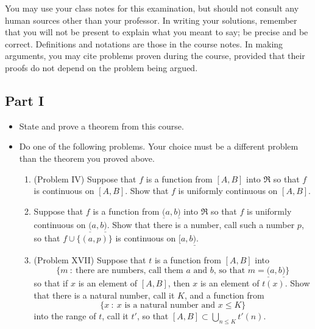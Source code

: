 \documentclass{article}
\begin{document}
You may use your class notes for this examination, but should not consult any human sources other than your professor. In writing your solutions, remember that you will not be present to explain what you meant to say; be precise and be correct. Definitions and notations are those in the course notes. In making arguments, you may cite problems proven during the course, provided that their proofs do not depend on the problem being argued.

\subsection*{Part I}

\begin{itemize}

  \item[1.] State and prove a theorem from this course.

  \item[2.] Do one of the following problems. Your choice must be a different problem than the theorem you proved above.
    \begin{enumerate}[\hspace{1cm}(a.)]

      \item (Problem IV) Suppose that $f$ is a function from $[A,B]$ into $\Re$ so that $f$ is continuous on $[A,B]$. Show that $f$ is uniformly continuous on $[A,B]$.

      \item Suppose that $f$ is a function from $\underline{(} a,b \underline{)}$ into $\Re$ so that $f$ is uniformly continuous on $\underline{(} a,b \underline{)}$. Show that there is a number, call such a number $p$, so that $f \cup \{ (a,p) \}$ is continuous on $[a,b \underline{)}$.

      \item (Problem XVII) Suppose that $t$ is a function from $[A,B]$ into 
        \begin{equation*}
        \{ m\ :\ \text{there are numbers, call them $a$ and $b$, so that } m = \underline{(} a,b \underline{)} \}
        \end{equation*}
        so that if $x$ is an element of $[A,B]$, then $x$ is an element of $t(x)$. Show that there is a natural number, call it $K$, and a function from 
        \begin{equation*}
        \{ x\ :\ x \text{ is a natural number and } x \leq K \}
        \end{equation*}
        into the range of $t$, call it $t'$, so that $[A,B] \subset \displaystyle{ \bigcup_{n \leq K} t'(n) }$.


\end{enumerate}
\end{itemize}
\end{document}
